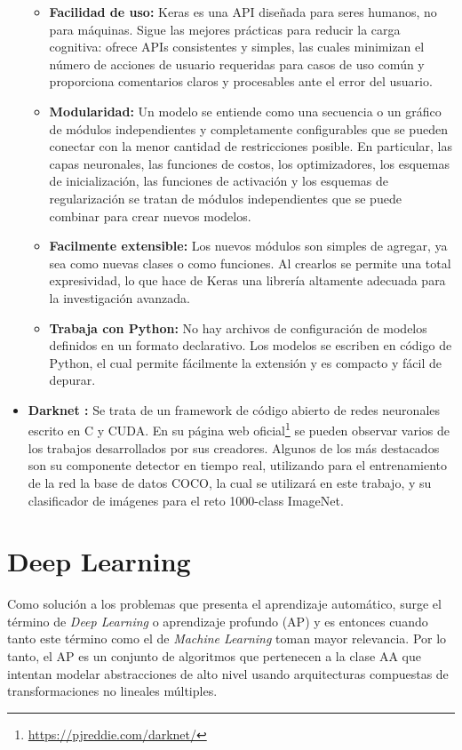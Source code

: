 \documentclass[a4paper, 12pt, oneside]{book}
\begin{document}
\begin{itemize}
\begin{itemize}
\item \textbf{Facilidad de uso:} Keras es una API diseñada para seres humanos, no para máquinas. Sigue las mejores prácticas para reducir la carga cognitiva: ofrece APIs consistentes y simples, las cuales minimizan el número de acciones de usuario requeridas para casos de uso común y proporciona comentarios claros y procesables ante el error del usuario.
\item \textbf{Modularidad:} Un modelo se entiende como una secuencia o un gráfico de módulos independientes y completamente configurables que se pueden conectar con la menor cantidad de restricciones posible. En particular, las capas neuronales, las funciones de costos, los optimizadores, los esquemas de inicialización, las funciones de activación y los esquemas de regularización se tratan de módulos independientes que se puede combinar para crear nuevos modelos.
\item \textbf{Facilmente extensible:} Los nuevos módulos son simples de agregar, ya sea como nuevas clases o como funciones. Al crearlos se permite una total expresividad, lo que hace de Keras una librería altamente adecuada para la investigación avanzada.
\item \textbf{Trabaja con Python:} No hay archivos de configuración de modelos definidos en un formato declarativo. Los modelos se escriben en código de Python, el cual permite fácilmente la extensión y es compacto y fácil de depurar.
\end{itemize}
\item \textbf{Darknet :} Se trata de un framework de código abierto de redes neuronales escrito en C y CUDA. En su página web oficial\footnote{\url{https://pjreddie.com/darknet/}} se pueden observar varios de los trabajos desarrollados por sus creadores. Algunos de los más destacados son su componente detector en tiempo real, utilizando para el entrenamiento de la red la base de datos COCO, la cual se utilizará en este trabajo, y su clasificador de imágenes para el reto 1000-class ImageNet.
\end{itemize}


\section{Deep Learning}

Como solución a los problemas que presenta el aprendizaje automático, surge el término de \textit{Deep Learning} o aprendizaje profundo (AP) y es entonces cuando tanto este término como el de \textit{Machine Learning} toman mayor relevancia. Por lo tanto, el AP es un conjunto de algoritmos que pertenecen a la clase AA que intentan modelar abstracciones de alto nivel usando arquitecturas compuestas de transformaciones no lineales múltiples.\\
\end{document}
